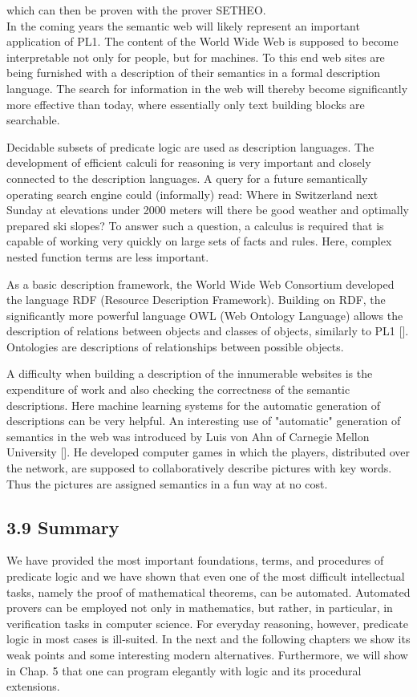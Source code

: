 \documentclass[10pt]{article}
\begin{document}
which can then be proven with the prover SETHEO.\\
In the coming years the semantic web will likely represent an important application of PL1. The content of the World Wide Web is supposed to become interpretable not only for people, but for machines. To this end web sites are being furnished with a description of their semantics in a formal description language. The search for information in the web will thereby become significantly more effective than today, where essentially only text building blocks are searchable.

Decidable subsets of predicate logic are used as description languages. The development of efficient calculi for reasoning is very important and closely connected to the description languages. A query for a future semantically operating search engine could (informally) read: Where in Switzerland next Sunday at elevations under 2000 meters will there be good weather and optimally prepared ski slopes? To answer such a question, a calculus is required that is capable of working very quickly on large sets of facts and rules. Here, complex nested function terms are less important.

As a basic description framework, the World Wide Web Consortium developed the language RDF (Resource Description Framework). Building on RDF, the significantly more powerful language OWL (Web Ontology Language) allows the description of relations between objects and classes of objects, similarly to PL1 [\cite{segaran2009programming}]. Ontologies are descriptions of relationships between possible objects.


A difficulty when building a description of the innumerable websites is the expenditure of work and also checking the correctness of the semantic descriptions. Here machine learning systems for the automatic generation of descriptions can be very helpful. An interesting use of "automatic" generation of semantics in the web was introduced by Luis von Ahn of Carnegie Mellon University [\cite{vahn2006games}]. He developed computer games in which the players, distributed over the network, are supposed to collaboratively describe pictures with key words. Thus the pictures are assigned semantics in a fun way at no cost.

\subsection*{3.9 Summary}
We have provided the most important foundations, terms, and procedures of predicate logic and we have shown that even one of the most difficult intellectual tasks, namely the proof of mathematical theorems, can be automated. Automated provers can be employed not only in mathematics, but rather, in particular, in verification tasks in computer science. For everyday reasoning, however, predicate logic in most cases is ill-suited. In the next and the following chapters we show its weak points and some interesting modern alternatives. Furthermore, we will show in Chap. 5 that one can program elegantly with logic and its procedural extensions.
\end{document}
